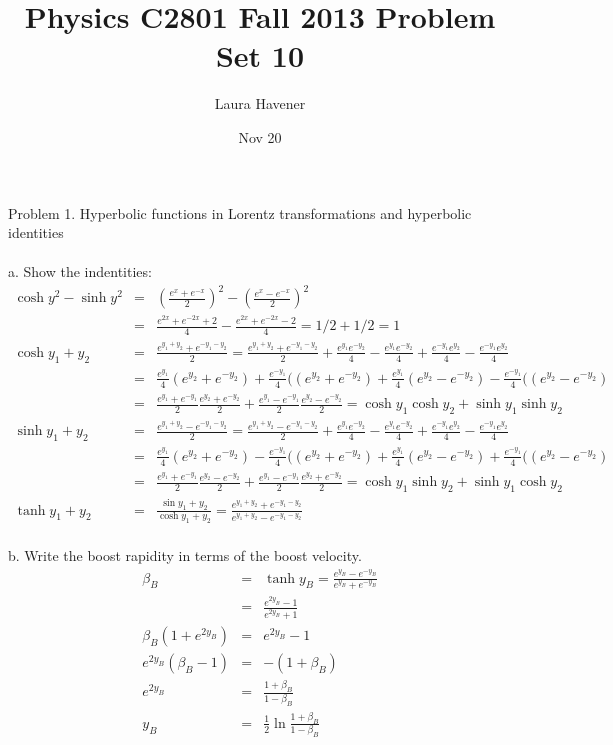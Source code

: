 \documentclass[11pt]{amsart}
\title{Physics C2801 Fall 2013 Problem Set 10}
\author{Laura Havener}
\date{Nov 20} %
\begin{document}
\maketitle

Problem 1.  Hyperbolic functions in Lorentz transformations and hyperbolic identities \\ \\
a. Show the indentities: \\
\begin{eqnarray*}
\cosh{y}^{2}-\sinh{y}^{2} &=& (\frac{e^{x}+e^{-x}}{2})^{2}- (\frac{e^{x}-e^{-x}}{2})^{2} \\
&=& \frac{e^{2x}+e^{-2x}+2}{4}-\frac{e^{2x}+e^{-2x}-2}{4} = 1/2+1/2 = 1 \\
\cosh{y_{1}+y_{2}} &=& \frac{e^{y_{1}+y_{2}}+e^{-y_{1}-y_{2}}}{2} =  \frac{e^{y_{1}+y_{2}}+e^{-y_{1}-y_{2}}}{2}+\frac{e^{y_{1}}e^{-y_{2}}}{4}-\frac{e^{y_{1}}e^{-y_{2}}}{4} +\frac{e^{-y_{1}}e^{y_{2}}}{4} -\frac{e^{-y_{1}}e^{y_{2}}}{4}\\
&=& \frac{e^{y_{1}}}{4}(e^{y_{2}}+e^{-y_{2}})+\frac{e^{-y_{1}}}{4}((e^{y_{2}}+e^{-y_{2}})+\frac{e^{y_{1}}}{4}(e^{y_{2}}-e^{-y_{2}})-\frac{e^{-y_{1}}}{4}((e^{y_{2}}-e^{-y_{2}})\\
&=& \frac{e^{y_{1}}+e^{-y_{1}}}{2}\frac{e^{y_{2}}+e^{-y_{2}}}{2}+ \frac{e^{y_{1}}-e^{-y_{1}}}{2}\frac{e^{y_{2}}-e^{-y_{2}}}{2} = \cosh{y_{1}}\cosh{y_{2}}+\sinh{y_{1}}\sinh{y_{2}} \\
\sinh{y_{1}+y_{2}} &=& \frac{e^{y_{1}+y_{2}}-e^{-y_{1}-y_{2}}}{2} =  \frac{e^{y_{1}+y_{2}}-e^{-y_{1}-y_{2}}}{2}+\frac{e^{y_{1}}e^{-y_{2}}}{4}-\frac{e^{y_{1}}e^{-y_{2}}}{4} +\frac{e^{-y_{1}}e^{y_{2}}}{4} -\frac{e^{-y_{1}}e^{y_{2}}}{4}\\
&=& \frac{e^{y_{1}}}{4}(e^{y_{2}}+e^{-y_{2}})-\frac{e^{-y_{1}}}{4}((e^{y_{2}}+e^{-y_{2}})+\frac{e^{y_{1}}}{4}(e^{y_{2}}-e^{-y_{2}})+\frac{e^{-y_{1}}}{4}((e^{y_{2}}-e^{-y_{2}})\\
&=& \frac{e^{y_{1}}+e^{-y_{1}}}{2}\frac{e^{y_{2}}-e^{-y_{2}}}{2}+ \frac{e^{y_{1}}-e^{-y_{1}}}{2}\frac{e^{y_{2}}+e^{-y_{2}}}{2} = \cosh{y_{1}}\sinh{y_{2}}+\sinh{y_{1}}\cosh{y_{2}} \\
\tanh{y_{1}+y_{2}} &=& \frac{\sin{y_{1}+y_{2}}}{\cosh{y_{1}+y_{2}}} = \frac{e^{y_{1}+y_{2}}+e^{-y_{1}-y_{2}}}{e^{y_{1}+y_{2}}-e^{-y_{1}-y_{2}}} 
\end{eqnarray*} \\
b. Write the boost rapidity in terms of the boost velocity. \\
\begin{eqnarray*}
\beta_{B} &=& \tanh{y_{B}} = \frac{e^{y_{B}}-e^{-y_{B}}}{e^{y_{B}}+e^{-y_{B}}} \\
&=& \frac{e^{2y_{B}}-1}{e^{2y_{B}}+1} \\
\beta_{B}(1+e^{2y_{B}}) &=& e^{2y_{B}}-1 \\
e^{2y_{B}}(\beta_{B}-1) &=& -(1+\beta_{B}) \\
e^{2y_{B}} &=& \frac{1+\beta_{B}}{1-\beta_{B}} \\
y_{B} &=& \frac{1}{2}\ln{\frac{1+\beta_{B}}{1-\beta_{B}}} 
\end{eqnarray*} \\
\end{document}
